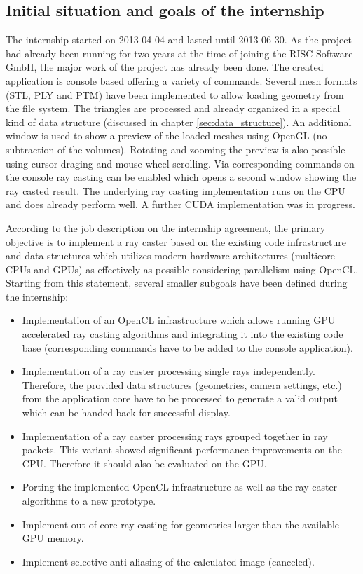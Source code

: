 \subsection{Initial situation and goals of the internship}
\label{sec:goals}

The internship started on 2013-04-04 and lasted until 2013-06-30. As the project had already been running for two years at the time of joining the RISC Software GmbH, the major work of the project has already been done. The created application is console based offering a variety of commands. Several mesh formats (STL, PLY and PTM) have been implemented to allow loading geometry from the file system. The triangles are processed and already organized in a special kind of data structure (discussed in chapter \ref{sec:data_structure}). An additional window is used to show a preview of the loaded meshes using OpenGL (no subtraction of the volumes). Rotating and zooming the preview is also possible using cursor draging and mouse wheel scrolling. Via corresponding commands on the console ray casting can be enabled which opens a second window showing the ray casted result. The underlying ray casting implementation runs on the CPU and does already perform well. A further CUDA implementation was in progress.

According to the job description on the internship agreement, the primary objective is to implement a ray caster based on the existing code infrastructure and data structures which utilizes modern hardware architectures (multicore CPUs and GPUs) as effectively as possible considering parallelism using OpenCL. Starting from this statement, several smaller subgoals have been defined during the internship:

\begin{itemize}
	\item Implementation of an OpenCL infrastructure which allows running GPU accelerated ray casting algorithms and integrating it into the existing code base (corresponding commands have to be added to the console application).
	\item Implementation of a ray caster processing single rays independently. Therefore, the provided data structures (geometries, camera settings, etc.) from the application core have to be processed to generate a valid output which can be handed back for successful display.
	\item Implementation of a ray caster processing rays grouped together in ray packets. This variant showed significant performance improvements on the CPU. Therefore it should also be evaluated on the GPU.
	\item Porting the implemented OpenCL infrastructure as well as the ray caster algorithms to a new prototype.
	\item Implement out of core ray casting for geometries larger than the available GPU memory.
	\item Implement selective anti aliasing of the calculated image (canceled).
\end{itemize}


